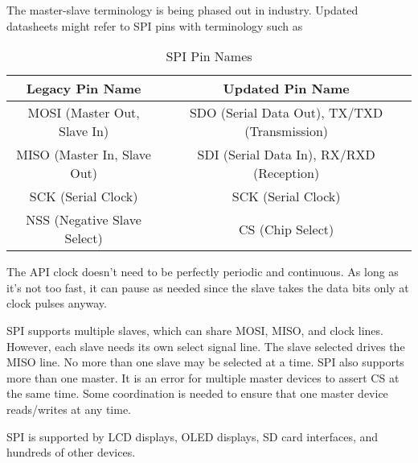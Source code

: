 The master-slave terminology is being
phased out in industry. Updated datasheets
might refer to SPI pins with terminology such as
\begin{table}[h!]
    \centering
    \begin{tabular}{|c|c|}
        \hline
        \textbf{Legacy Pin Name}    & \textbf{Updated Pin Name}                    \\ \hline
        MOSI (Master Out, Slave In) & SDO (Serial Data Out), TX/TXD (Transmission) \\ \hline
        MISO (Master In, Slave Out) & SDI (Serial Data In), RX/RXD (Reception)     \\ \hline
        SCK (Serial Clock)          & SCK (Serial Clock)                           \\ \hline
        NSS (Negative Slave Select) & CS (Chip Select)                             \\ \hline
    \end{tabular}
    \caption{SPI Pin Names}
    \label{tab:spi_pin_names}
\end{table}

The API clock doesn't need to be perfectly
periodic and continuous. As long as it's not
too fast, it can pause as needed since
the slave takes the data bits only
at clock pulses anyway.

SPI supports multiple slaves, which can share
MOSI, MISO, and clock lines. However,
each slave needs its own select signal line.
The slave selected drives the MISO line. No
more than one slave may be selected at a
time. SPI also supports more than one
master. It is an error for multiple master
devices to assert CS at the same time.
Some coordination is needed to ensure
that one master device reads/writes at any time.

SPI is supported by LCD displays,
OLED displays, SD card interfaces, and
hundreds of other devices.
